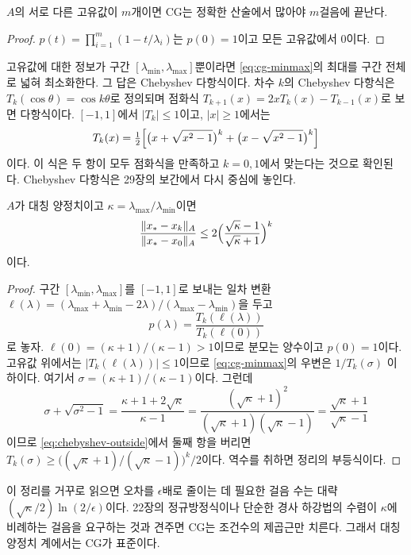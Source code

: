 \begin{corollary}
\label{cor:cg-distinct}
$A$의 서로 다른 고유값이 $m$개이면 CG는 정확한 산술에서 많아야 $m$걸음에 끝난다.
\end{corollary}

\begin{proof}
$p(t)=\prod_{i=1}^m(1-t/\lambda_i)$는 $p(0)=1$이고 모든 고유값에서 $0$이다.
\end{proof}

고유값에 대한 정보가 구간 $[\lambda_{\min},\lambda_{\max}]$뿐이라면 \eqref{eq:cg-minmax}의 최대를 구간 전체로 넓혀 최소화한다. 그 답은 Chebyshev 다항식이다. 차수 $k$의 Chebyshev 다항식은 $T_k(\cos\theta)=\cos k\theta$로 정의되며 점화식 $T_{k+1}(x)=2xT_k(x)-T_{k-1}(x)$로 보면 다항식이다. $[-1,1]$에서 $|T_k|\le1$이고, $|x|\ge1$에서는
\begin{equation}
\label{eq:chebyshev-outside}
T_k(x)=\tfrac12\Bigl[\bigl(x+\sqrt{x^2-1}\bigr)^k+\bigl(x-\sqrt{x^2-1}\bigr)^k\Bigr]
\end{equation}
이다. 이 식은 두 항이 모두 점화식을 만족하고 $k=0,1$에서 맞는다는 것으로 확인된다. Chebyshev 다항식은 29장의 보간에서 다시 중심에 놓인다.

\begin{theorem}
\label{thm:cg-chebyshev}
$A$가 대칭 양정치이고 $\kappa=\lambda_{\max}/\lambda_{\min}$이면
\[
\frac{\|x_\ast-x_k\|_A}{\|x_\ast-x_0\|_A}\le2\Bigl(\frac{\sqrt\kappa-1}{\sqrt\kappa+1}\Bigr)^k
\]
이다.
\end{theorem}

\begin{proof}
구간 $[\lambda_{\min},\lambda_{\max}]$를 $[-1,1]$로 보내는 일차 변환 $\ell(\lambda)=(\lambda_{\max}+\lambda_{\min}-2\lambda)/(\lambda_{\max}-\lambda_{\min})$을 두고
\[
p(\lambda)=\frac{T_k(\ell(\lambda))}{T_k(\ell(0))}
\]
로 놓자. $\ell(0)=(\kappa+1)/(\kappa-1)>1$이므로 분모는 양수이고 $p(0)=1$이다. 고유값 위에서는 $|T_k(\ell(\lambda))|\le1$이므로 \eqref{eq:cg-minmax}의 우변은 $1/T_k(\sigma)$ 이하이다. 여기서 $\sigma=(\kappa+1)/(\kappa-1)$이다. 그런데
\[
\sigma+\sqrt{\sigma^2-1}=\frac{\kappa+1+2\sqrt\kappa}{\kappa-1}=\frac{(\sqrt\kappa+1)^2}{(\sqrt\kappa+1)(\sqrt\kappa-1)}=\frac{\sqrt\kappa+1}{\sqrt\kappa-1}
\]
이므로 \eqref{eq:chebyshev-outside}에서 둘째 항을 버리면 $T_k(\sigma)\ge\bigl((\sqrt\kappa+1)/(\sqrt\kappa-1)\bigr)^k/2$이다. 역수를 취하면 정리의 부등식이다.
\end{proof}

이 정리를 거꾸로 읽으면 오차를 $\epsilon$배로 줄이는 데 필요한 걸음 수는 대략 $(\sqrt\kappa/2)\ln(2/\epsilon)$이다. 22장의 정규방정식이나 단순한 경사 하강법의 수렴이 $\kappa$에 비례하는 걸음을 요구하는 것과 견주면 CG는 조건수의 제곱근만 치른다. 그래서 대칭 양정치 계에서는 CG가 표준이다.

